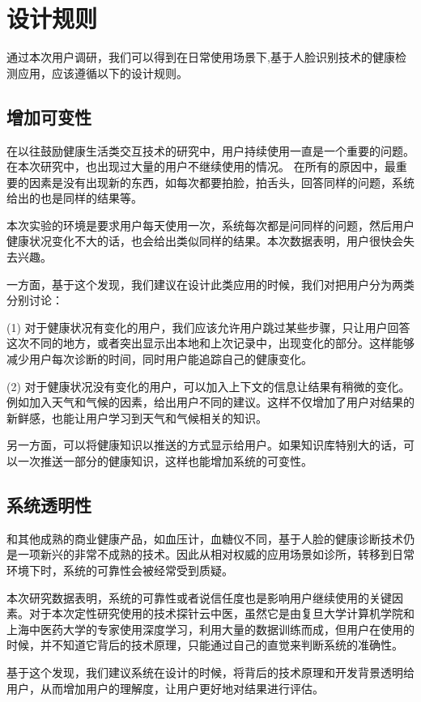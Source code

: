 \section{设计规则}

通过本次用户调研，我们可以得到在日常使用场景下,基于人脸识别技术的健康检测应用，应该遵循以下的设计规则。

\subsection{增加可变性}
在以往鼓励健康生活类交互技术的研究中，用户持续使用一直是一个重要的问题。在本次研究中，也出现过大量的用户不继续使用的情况。
在所有的原因中，最重要的因素是没有出现新的东西，如每次都要拍脸，拍舌头，回答同样的问题，系统给出的也是同样的结果等。

本次实验的环境是要求用户每天使用一次，系统每次都是问同样的问题，然后用户健康状况变化不大的话，也会给出类似同样的结果。本次数据表明，用户很快会失去兴趣。

一方面，基于这个发现，我们建议在设计此类应用的时候，我们对把用户分为两类分别讨论：

(1) 对于健康状况有变化的用户，我们应该允许用户跳过某些步骤，只让用户回答这次不同的地方，或者突出显示出本地和上次记录中，出现变化的部分。这样能够减少用户每次诊断的时间，同时用户能追踪自己的健康变化。

(2) 对于健康状况没有变化的用户，可以加入上下文的信息让结果有稍微的变化。例如加入天气和气候的因素，给出用户不同的建议。这样不仅增加了用户对结果的新鲜感，也能让用户学习到天气和气候相关的知识。

另一方面，可以将健康知识以推送的方式显示给用户。如果知识库特别大的话，可以一次推送一部分的健康知识，这样也能增加系统的可变性。

\subsection{系统透明性}

和其他成熟的商业健康产品，如血压计，血糖仪不同，基于人脸的健康诊断技术仍是一项新兴的非常不成熟的技术。因此从相对权威的应用场景如诊所，转移到日常环境下时，系统的可靠性会被经常受到质疑。

本次研究数据表明，系统的可靠性或者说信任度也是影响用户继续使用的关键因素。对于本次定性研究使用的技术探针云中医，虽然它是由复旦大学计算机学院和上海中医药大学的专家使用深度学习，利用大量的数据训练而成，但用户在使用的时候，并不知道它背后的技术原理，只能通过自己的直觉来判断系统的准确性。

基于这个发现，我们建议系统在设计的时候，将背后的技术原理和开发背景透明给用户，从而增加用户的理解度，让用户更好地对结果进行评估。

